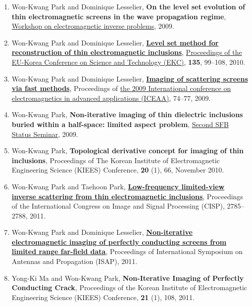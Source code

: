 \documentclass[10pt,A4]{article}
\begin{document}
\begin{enumerate}
\item\label{C-EIT2009} Won-Kwang Park and Dominique Lesselier, \textbf{On the level set evolution of thin electromagnetic screens in the wave propagation regime}, \href{http://www.maths.manchester.ac.uk/eit2009/}{Workshop on electromagnetic inverse problems}, 2009.
\item\label{C-EKC2009} Won-Kwang Park and Dominique Lesselier, \href{http://dx.doi.org/10.1007/978-3-642-13624-5_11}{\textbf{Level set method for reconstruction of thin electromagnetic inclusions}}, \href{http://www.springer.com/engineering/book/978-3-642-13623-8}{Proceedings of the EU-Korea Conference on Science and Technology (EKC)}, \textbf{135}, 99--108, 2010.
\item\label{C-ICEAA2009} Won-Kwang Park and Dominique Lesselier, \href{http://dx.doi.org/10.1109/ICEAA.2009.5297605}{\textbf{Imaging of scattering screens via fast methods}}, Proceedings of \href{http://www.iceaa.net/}{the 2009 International conference on electromagnetics in advanced applications (ICEAA)}, 74--77, 2009.
\item\label{C-SFB2009} Won-Kwang Park, \textbf{Non-iterative imaging of thin dielectric inclusions buried within a half-space: limited aspect problem}, \href{http://math.uni-graz.at/mobis/meetings.html}{Second SFB Status Seminar}, 2009.
\item\label{C-KIEES2010} Won-Kwang Park, \textbf{Topological derivative concept for imaging of thin inclusions}, Proceedings of The Korean Institute of Electromagnetic Engineering Science (KIEES) Conference, \textbf{20} (1), 66, November 2010.
\item\label{C-CISP2011} Won-Kwang Park and Taehoon Park, \href{http://dx.doi.org/10.1109/CISP.2011.6100710}{\textbf{Low-frequency limited-view inverse scattering from thin electromagnetic inclusions}}, Proceedings of the  International Congress on Image and Signal Processing (CISP), 2785--2788, 2011.
\item\label{C-ISAP2011} Won-Kwang Park and Dominique Lesselier, \href{http://ap-s.ei.tuat.ac.jp/isapx/2011/}{\textbf{Non-iterative electromagnetic imaging of perfectly conducting screens from limited range far-field data}}, Proceedings of International Symposium on Antennas and Propagation (ISAP), 2011.
\item\label{C-KIEES2011} Yong-Ki Ma and Won-Kwang Park, \textbf{Non-Iterative Imaging of Perfectly Conducting Crack}, Proceedings of the Korean Institute of Electromagnetic Engineering Science (KIEES) Conference, \textbf{21} (1), 108, 2011.

\end{enumerate}
\end{document}
